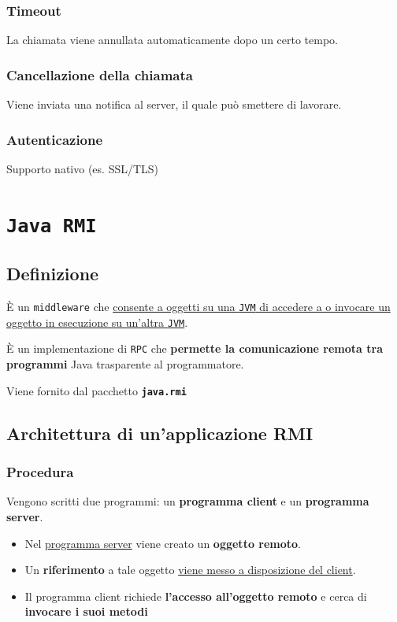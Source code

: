 \subsection{Timeout}
La chiamata viene annullata automaticamente dopo un certo tempo.
\subsection{Cancellazione della chiamata}
Viene inviata una notifica al server, il quale può smettere di lavorare.
\subsection{Autenticazione}
Supporto nativo (es. SSL/TLS)

\chapter{\texttt{Java RMI}}
\section{Definizione}
È un \texttt{middleware} che \uline{consente a oggetti su una \texttt{JVM} di accedere a o invocare un oggetto in esecuzione su un'altra \texttt{JVM}}.

È un implementazione di \texttt{RPC} che \textbf{permette la comunicazione remota tra programmi} Java trasparente al programmatore.

Viene fornito dal pacchetto \textbf{\texttt{java.rmi}}

\section{Architettura di un'applicazione RMI}
\subsection{Procedura}
Vengono scritti due programmi: un \textbf{programma client} e un \textbf{programma server}.
\begin{itemize}
    \item Nel \uline{programma server} viene creato un \textbf{oggetto remoto}.
    \item Un \textbf{riferimento} a tale oggetto \uline{viene messo a disposizione del client}.
    \item Il programma client richiede \textbf{l'accesso all'oggetto remoto} e cerca di \textbf{invocare i suoi metodi}
\end{itemize}
